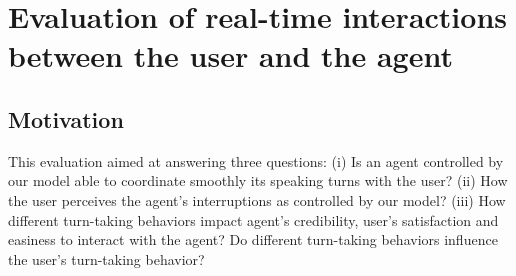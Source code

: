 \section{Evaluation of real-time interactions between the user and the agent}
\label{sec:eval}


\subsection{Motivation}
\label{subsec:mot}

This evaluation aimed at answering three questions: 
(i) Is an agent controlled by our model able to coordinate smoothly its speaking turns with the user?
(ii) How the user perceives the agent's interruptions as controlled by our model?
(iii) How different turn-taking behaviors impact agent's credibility, user's satisfaction and easiness to interact with the agent? Do different turn-taking behaviors influence the user's turn-taking behavior? 

